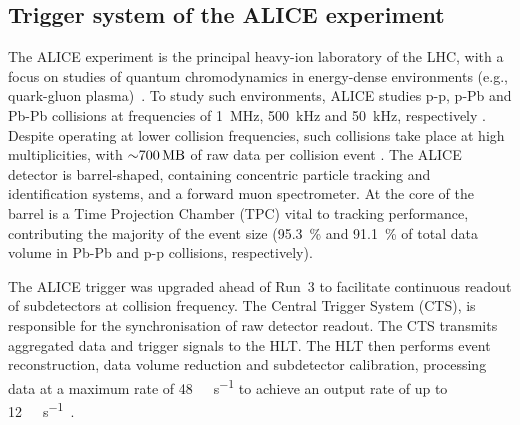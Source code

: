 \subsection{Trigger system of the ALICE experiment}
The ALICE experiment is the principal heavy-ion laboratory of the LHC, with a focus on studies of quantum chromodynamics in energy-dense environments (e.g.,  quark-gluon plasma)~\cite{alice-performance-paper-run1}. To study such environments, ALICE studies p-p, p-Pb and Pb-Pb collisions at frequencies of \SI{1}{\mega\hertz}, \SI{500}{\kilo\hertz} and \SI{50}{\kilo\hertz}, respectively \cite{alice-trigger-run3}. Despite operating at lower collision frequencies, such collisions take place at high multiplicities, with ${\sim}\SI{700}{\mega\byte}$ of raw data per collision event \cite{alice-rta-trigger}. The ALICE detector is barrel-shaped, containing concentric particle tracking and identification systems, and a forward muon spectrometer. At the core of the barrel is a Time Projection Chamber (TPC) vital to tracking performance, contributing the majority of the event size (\SI{95.3}{\percent} and \SI{91.1}{\percent} of total data volume in Pb-Pb and p-p collisions, respectively).

The ALICE trigger was upgraded ahead of Run~3 to facilitate continuous readout of subdetectors at collision frequency. The Central Trigger System (CTS), is responsible for the synchronisation of raw detector readout. The CTS transmits aggregated data and trigger signals to the HLT. The HLT then performs event reconstruction, data volume reduction and subdetector calibration, processing data at a maximum rate of \SI{48}{\giga\byte\per\second} to achieve an output rate of up to \SI{12}{\giga\byte\per\second}~\cite{alice-rta-trigger}.
